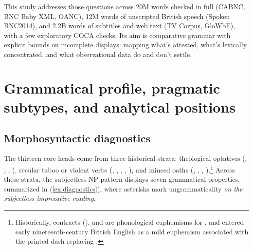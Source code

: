 \documentclass[12pt]{article}
\begin{document}
This study addresses those questions across 20M words checked in full (CABNC, BNC Baby XML, OANC), 12M words of unscripted British speech (Spoken BNC2014), and 2.2B words of subtitles and web text (TV Corpus, GloWbE), with a few exploratory COCA checks. Its aim is comparative grammar with explicit bounds on incomplete displays: mapping what's attested, what's lexically concentrated, and what observational data do and don't settle.

\section{Grammatical profile, pragmatic subtypes, and analytical positions}
\label{sec:frameworks}

\subsection{Morphosyntactic diagnostics}
\label{sec:diagnostics}

The thirteen core heads come from three historical strata: theological optatives (, , , ), secular taboo or violent verbs (, , , , ), and minced oaths (, , , ).\footnote{Historically,  contracts (),  and  are phonological euphemisms for , and  entered early nineteenth-century British English as a mild euphemism associated with the printed dash replacing  \citep{mcenery2006,allanburridge2006,ljung2011}.} Across these strata, the subjectless NP pattern displays seven grammatical properties, summarized in (\ref{ex:diagnostics}), where asterisks mark ungrammaticality \emph{on the subjectless imprecative reading}.
\end{document}
